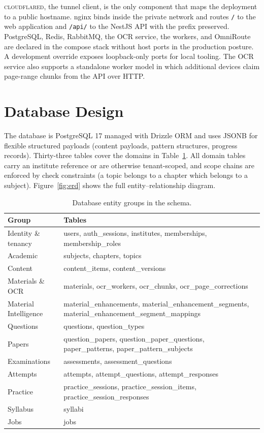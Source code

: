 \textsc{cloudflared}, the tunnel client, is the only component that maps the
deployment to a public hostname. nginx binds inside the private network and
routes \texttt{/} to the web application and \texttt{/api/} to the NestJS
API with the prefix preserved. PostgreSQL, Redis, RabbitMQ, the OCR service,
the workers, and OmniRoute are declared in the compose stack without host
ports in the production posture. A development override exposes loopback-only
ports for local tooling. The OCR service also supports a standalone worker
model in which additional devices claim page-range chunks from the API over
HTTP.

\section{Database Design}

The database is PostgreSQL 17 managed with Drizzle ORM and uses JSONB for
flexible structured payloads (content payloads, pattern structures, progress
records). Thirty-three tables cover the domains in
Table~\ref{tab:entities}. All domain tables carry an institute reference or
are otherwise tenant-scoped, and scope chains are enforced by check
constraints (a topic belongs to a chapter which belongs to a subject).
Figure~\ref{fig:erd} shows the full entity--relationship diagram.

\begin{table}[H]
\centering
\caption{Database entity groups in the schema.}
\label{tab:entities}
\small
\begin{tabular}{@{}p{3.6cm} p{\dimexpr\textwidth-3.6cm-12pt\relax}@{}}
\toprule
\textbf{Group} & \textbf{Tables} \\
\midrule
Identity \& tenancy & users, auth\_sessions, institutes, memberships, membership\_roles \\
Academic & subjects, chapters, topics \\
Content & content\_items, content\_versions \\
Materials \& OCR & materials, ocr\_workers, ocr\_chunks, ocr\_page\_corrections \\
Material Intelligence & material\_enhancements, material\_enhancement\_segments, material\_enhancement\_segment\_mappings \\
Questions & questions, question\_types \\
Papers & question\_papers, question\_paper\_questions, paper\_patterns, paper\_pattern\_subjects \\
Examinations & assessments, assessment\_questions \\
Attempts & attempts, attempt\_questions, attempt\_responses \\
Practice & practice\_sessions, practice\_session\_items, practice\_session\_responses \\
Syllabus & syllabi \\
Jobs & jobs \\
\bottomrule
\end{tabular}
\end{table}

